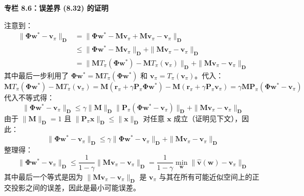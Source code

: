 \documentclass[UTF8]{article}
\begin{document}
\begin{proofbox}
\textbf{专栏 8.6：误差界 (8.32) 的证明}

注意到：
\[
\begin{aligned}
\|\boldsymbol{\Phi}\boldsymbol{w}^* - \boldsymbol{v}_\pi\|_{\boldsymbol{D}}
&= \|\boldsymbol{\Phi}\boldsymbol{w}^* - \boldsymbol{M}\boldsymbol{v}_\pi + \boldsymbol{M}\boldsymbol{v}_\pi - \boldsymbol{v}_\pi\|_{\boldsymbol{D}} \\
&\leq \|\boldsymbol{\Phi}\boldsymbol{w}^* - \boldsymbol{M}\boldsymbol{v}_\pi\|_{\boldsymbol{D}} + \|\boldsymbol{M}\boldsymbol{v}_\pi - \boldsymbol{v}_\pi\|_{\boldsymbol{D}} \\
&= \|\boldsymbol{M}T_\pi(\boldsymbol{\Phi}\boldsymbol{w}^*) - \boldsymbol{M}T_\pi(\boldsymbol{v}_\pi)\|_{\boldsymbol{D}} + \|\boldsymbol{M}\boldsymbol{v}_\pi - \boldsymbol{v}_\pi\|_{\boldsymbol{D}}
\end{aligned}
\]
其中最后一步利用了 $\boldsymbol{\Phi}\boldsymbol{w}^* = \boldsymbol{M}T_\pi(\boldsymbol{\Phi}\boldsymbol{w}^*)$ 和 $\boldsymbol{v}_\pi = T_\pi(\boldsymbol{v}_\pi)$。代入：
\[
\boldsymbol{M}T_\pi(\boldsymbol{\Phi}\boldsymbol{w}^*) - \boldsymbol{M}T_\pi(\boldsymbol{v}_\pi) = \boldsymbol{M}(\boldsymbol{r}_\pi + \gamma\boldsymbol{P}_\pi\boldsymbol{\Phi}\boldsymbol{w}^*) - \boldsymbol{M}(\boldsymbol{r}_\pi + \gamma\boldsymbol{P}_\pi\boldsymbol{v}_\pi) = \gamma\boldsymbol{M}\boldsymbol{P}_\pi(\boldsymbol{\Phi}\boldsymbol{w}^* - \boldsymbol{v}_\pi)
\]
代入不等式得：
\[
\|\boldsymbol{\Phi}\boldsymbol{w}^* - \boldsymbol{v}_\pi\|_{\boldsymbol{D}} \leq \gamma\|\boldsymbol{M}\|_{\boldsymbol{D}}\|\boldsymbol{P}_\pi(\boldsymbol{\Phi}\boldsymbol{w}^* - \boldsymbol{v}_\pi)\|_{\boldsymbol{D}} + \|\boldsymbol{M}\boldsymbol{v}_\pi - \boldsymbol{v}_\pi\|_{\boldsymbol{D}}
\]
由于 $\|\boldsymbol{M}\|_{\boldsymbol{D}} = 1$ 且 $\|\boldsymbol{P}_\pi\boldsymbol{x}\|_{\boldsymbol{D}} \leq \|\boldsymbol{x}\|_{\boldsymbol{D}}$ 对任意 $\boldsymbol{x}$ 成立（证明见下文），因此：
\[
\|\boldsymbol{\Phi}\boldsymbol{w}^* - \boldsymbol{v}_\pi\|_{\boldsymbol{D}} \leq \gamma\|\boldsymbol{\Phi}\boldsymbol{w}^* - \boldsymbol{v}_\pi\|_{\boldsymbol{D}} + \|\boldsymbol{M}\boldsymbol{v}_\pi - \boldsymbol{v}_\pi\|_{\boldsymbol{D}}
\]
整理得：
\[
\|\boldsymbol{\Phi}\boldsymbol{w}^* - \boldsymbol{v}_\pi\|_{\boldsymbol{D}} \leq \frac{1}{1-\gamma} \|\boldsymbol{M}\boldsymbol{v}_\pi - \boldsymbol{v}_\pi\|_{\boldsymbol{D}}
= \frac{1}{1-\gamma} \min_{\boldsymbol{w}} \|\hat{\boldsymbol{v}}(\boldsymbol{w}) - \boldsymbol{v}_\pi\|_{\boldsymbol{D}}
\]
其中最后一个等式是因为 $\|\boldsymbol{M}\boldsymbol{v}_\pi - \boldsymbol{v}_\pi\|_{\boldsymbol{D}}$ 是 $\boldsymbol{v}_\pi$ 与其在所有可能近似空间上的正交投影之间的误差，因此是最小可能误差。


\end{proofbox}
\end{document}
